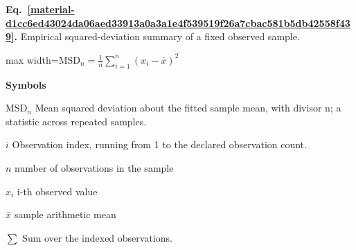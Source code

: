 \documentclass[11pt,a4paper]{article}
\begin{document}
\par\medskip
\noindent\begin{minipage}{\linewidth}
\label{material-d1cc6ed43024da06aed33913a0a3a1e4f539519f26a7cbac581b5db42558f439}
\noindent\textbf{Eq.~\ref*{material-d1cc6ed43024da06aed33913a0a3a1e4f539519f26a7cbac581b5db42558f439}.} Empirical squared-deviation summary of a fixed observed sample.\par\nopagebreak
\begin{center}\begin{adjustbox}{max width=\linewidth}$\displaystyle \mathrm{MSD}_n=\frac1n{\textstyle\sum_{i=1}^n}(x_i-\bar x)^2$\end{adjustbox}\end{center}

\par\noindent\textbf{Symbols}

\par\noindent\textbf{\(\mathrm{MSD}_n\)} Mean squared deviation about the fitted sample mean, with divisor n; a statistic across repeated samples.

\par\noindent\textbf{\(i\)} Observation index, running from 1 to the declared observation count.

\par\noindent\textbf{\(n\)} number of observations in the sample

\par\noindent\textbf{\(x_i\)} i-th observed value

\par\noindent\textbf{\(\bar{x}\)} sample arithmetic mean

\par\noindent\textbf{\(\sum\)} Sum over the indexed observations.

\end{minipage}\par
\medskip
\end{document}
